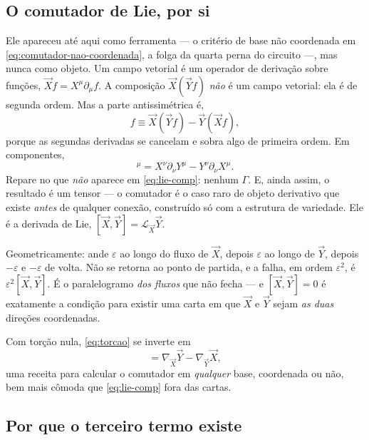\documentclass[12pt,a4paper,oneside]{book}
\theoremstyle{rgplain}
\theoremstyle{rgremark}
\newcommand{\Lie}{\mathcal{L}}
\begin{document}
\subsection*{O comutador de Lie, por si}

Ele apareceu até aqui como ferramenta --- o critério de base não coordenada em
\eqref{eq:comutador-nao-coordenada}, a folga da quarta perna do circuito ---,
mas nunca como objeto. Um campo vetorial é um operador de derivação sobre
funções, $\vec Xf=X^\mu\partial_\mu f$. A composição $\vec X(\vec Yf)$
\emph{não} é um campo vetorial: ela é de segunda ordem. Mas a parte
antissimétrica é,
\begin{equation}
  [\vec X,\vec Y]f\equiv\vec X(\vec Yf)-\vec Y(\vec Xf) ,
  \label{eq:lie-def}
\end{equation}
porque as segundas derivadas se cancelam e sobra algo de primeira ordem. Em
componentes,
\begin{equation}
  [\vec X,\vec Y]^\mu=X^\nu\partial_\nu Y^\mu-Y^\nu\partial_\nu X^\mu .
  \label{eq:lie-comp}
\end{equation}
Repare no que \emph{não} aparece em \eqref{eq:lie-comp}: nenhum $\Gamma$. E,
ainda assim, o resultado é um tensor --- o comutador é o caso raro de objeto
derivativo que existe \emph{antes} de qualquer conexão, construído só com a
estrutura de variedade. Ele é a derivada de Lie,
$[\vec X,\vec Y]=\Lie_{\vec X}\vec Y$.

Geometricamente: ande $\varepsilon$ ao longo do fluxo de $\vec X$, depois
$\varepsilon$ ao longo de $\vec Y$, depois $-\varepsilon$ e $-\varepsilon$ de
volta. Não se retorna ao ponto de partida, e a falha, em ordem
$\varepsilon^2$, é $\varepsilon^2[\vec X,\vec Y]$. É o paralelogramo
\emph{dos fluxos} que não fecha --- e $[\vec X,\vec Y]=0$ é exatamente a
condição para existir uma carta em que $\vec X$ e $\vec Y$ sejam \emph{as
duas} direções coordenadas.

Com torção nula, \eqref{eq:torcao} se inverte em
\begin{equation}
  [\vec X,\vec Y]=\nabla_{\vec X}\vec Y-\nabla_{\vec Y}\vec X ,
  \label{eq:lie-por-nabla}
\end{equation}
uma receita para calcular o comutador em \emph{qualquer} base, coordenada ou
não, bem mais cômoda que \eqref{eq:lie-comp} fora das cartas.

\subsection*{Por que o terceiro termo existe}
\end{document}
